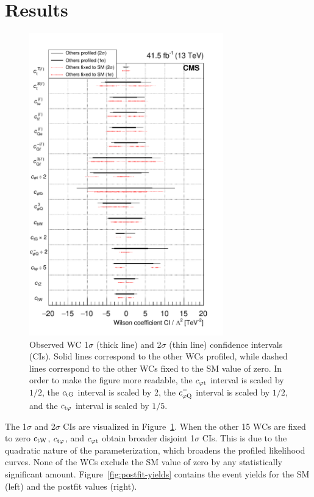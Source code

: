 \documentclass[12pt]{article}
\begin{document}
\section{Results}

\begin{figure}[!htbp]
	\centering
	\includegraphics[width=0.75\textwidth]{plots/BestScan}
	\caption{Observed WC 1$\sigma$ (thick line) and 2$\sigma$ (thin line) confidence intervals (CIs). Solid lines correspond to the other WCs profiled, while dashed lines correspond to the other WCs fixed to the SM value of zero. In order to make the figure more readable, the $c_{\mathrm{\varphi t}}$ interval is scaled by $1/2$, the $c_{\mathrm{tG}}$ interval is scaled by 2, the $c^{-}_{\mathrm{\varphi Q}}$ interval is scaled by $1/2$, and the $c_{\mathrm{t\varphi}}$ interval is scaled by $1/5$.}
	\label{fig:SummaryPlot}
\end{figure}

The 1$\sigma$ and 2$\sigma$ CIs are visualized in Figure~\ref{fig:SummaryPlot}. When the other 15 WCs are fixed to zero $c_{\mathrm{tW}}$, $c_{\mathrm{t\varphi}}$, and $c_{\mathrm{\varphi t}}$ obtain broader disjoint 1$\sigma$ CIs. This is due to the quadratic nature of the parameterization, which broadens the profiled likelihood curves. None of the WCs exclude the SM value of zero by any statistically significant amount. Figure~\ref{fig:postfit-yields} contains the event yields for the SM (left) and the postfit values (right).
\end{document}
